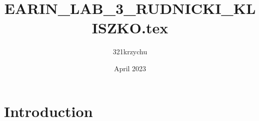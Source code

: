 \documentclass{article}
\title{EARIN_LAB_3_RUDNICKI_KLISZKO.tex}
\author{321krzychu }
\date{April 2023}
\begin{document}
\maketitle

\section{Introduction}
\end{document}
